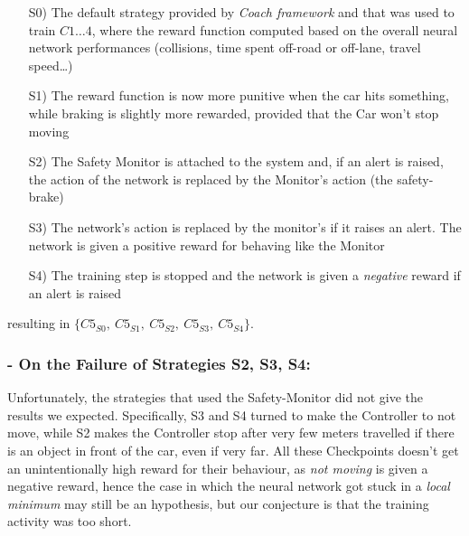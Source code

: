 \begin{itemize}
	\item[S0)] The default strategy provided by \textsl{Coach framework} and that was used to train $C1\dots 4$, where the reward function computed based on the overall neural network performances (collisions, time spent off-road or off-lane, travel speed\dots)
	\item[S1)] The reward function is now more punitive when the car hits something, while braking is slightly more rewarded, provided that the Car won't stop moving
	\item[S2)] The Safety Monitor is attached to the system and, if an alert is raised, the action of the network is replaced by the Monitor's action (the safety-brake)
	\item[S3)] The network's action is replaced by the monitor's if it raises an alert. The network is given a positive reward for behaving like the Monitor
	\item[S4)] The training step is stopped and the network is given a \textsl{negative} reward if an alert is raised
\end{itemize}

resulting in $\{C5_{S0},\: C5_{S1},\: C5_{S2},\: C5_{S3},\: C5_{S4}\}$.



\subsubsection{- On the Failure of Strategies S2, S3, S4:}

Unfortunately, the strategies that used the Safety-Monitor did not give the results we expected. Specifically, S3 and S4 turned to make the Controller to not move, while S2 makes the Controller stop after very few meters travelled if there is an object in front of the car, even if very far. All these Checkpoints doesn't get an unintentionally high reward for their behaviour, as \textsl{not moving} is given a negative reward, hence the case in which the neural network got stuck in a \textsl{local minimum} may still be an hypothesis, but our conjecture is that the training activity was too short.

